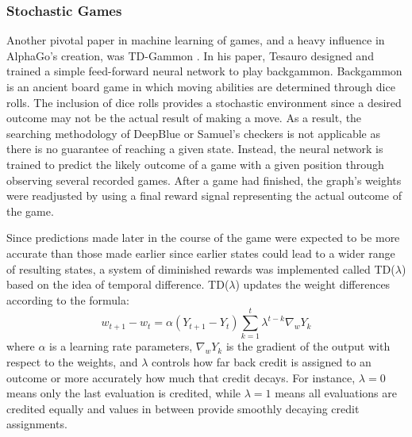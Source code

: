 

\subsubsection*{Stochastic Games}


Another pivotal paper in machine learning of games,
and a heavy influence in AlphaGo's creation,
was TD-Gammon
\cite{tdgammon}.
%
In his paper,
Tesauro designed and trained a simple feed-forward neural network to play 
backgammon.
%
Backgammon is an ancient board game in which moving abilities are determined
through dice rolls.
%
The inclusion of dice rolls provides a stochastic environment since
a desired outcome may not be the actual result of making a move.
%
As a result,
the searching methodology of DeepBlue or Samuel's checkers is not applicable
as there is no guarantee of reaching a given state.
%
Instead,
the neural network is trained to predict the likely outcome of a game with a
given position
through observing several recorded games.
%
After a game had finished,
the graph's weights were readjusted by using a final reward signal representing
the actual outcome of the game.

Since predictions made later in the course of the game were expected to be more
accurate than those made earlier
since earlier states could lead to a wider range of resulting states,
a system of diminished rewards was implemented called
TD($\lambda$) based on the idea of temporal difference.
%
TD($\lambda$) updates the weight differences according to the formula:
\[
	w_{t+1} - w_t =
		\alpha (Y_{t+1}-Y_t)
		\sum_{k=1}^t {\lambda^{t-k} \nabla_w Y_k}
\]
where $\alpha$ is a learning rate parameters,
$\nabla_w Y_k$ is the gradient of the output with respect to the weights,
and $\lambda$ controls how far back credit is assigned to an outcome
or more accurately how much that credit decays.
%
For instance,
$\lambda=0$ means only the last evaluation is credited,
while $\lambda=1$ means all evaluations are credited equally
and values in between provide smoothly decaying credit assignments.

